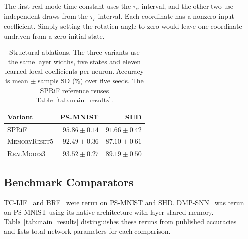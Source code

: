 \documentclass[letterpaper,journal]{IEEEtran}
\newcommand{\mr}{\textnormal{\textsc{MemoryReset5}}}
\newcommand{\rmodes}{\textnormal{\textsc{RealModes3}}}
\begin{document}
The first real-mode time constant uses the $\tau_\alpha$ interval, and the other two use independent draws from the $\tau_\rho$ interval. Each coordinate has a nonzero input coefficient. Simply setting the rotation angle to zero would leave one coordinate undriven from a zero initial state.

\begin{table}[t]
\caption{Structural ablations. The three variants use the same layer widths, five states and eleven learned local coefficients per neuron. Accuracy is mean $\pm$ sample SD (\%) over five seeds. The SPRiF reference reuses Table~\ref{tab:main_results}.}
\label{tab:ablation}
\centering\footnotesize
\begin{tabular}{@{}lrr@{}}
\toprule
Variant & PS-MNIST & SHD\\
\midrule
SPRiF & $95.86\pm0.14$ & $91.66\pm0.42$\\
\mr & $92.49\pm0.36$ & $87.10\pm0.61$\\
\rmodes & $93.52\pm0.27$ & $89.19\pm0.50$\\
\bottomrule
\end{tabular}
\end{table}

\subsection{Benchmark Comparators}
\label{sec:baselines}

TC-LIF~\cite{tclif} and BRF~\cite{brf} were rerun on PS-MNIST and SHD. DMP-SNN~\cite{sun2026dmp} was rerun on PS-MNIST using its native architecture with layer-shared memory. Table~\ref{tab:main_results} distinguishes these reruns from published accuracies and lists total network parameters for each comparison.
\end{document}
